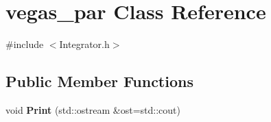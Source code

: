 \hypertarget{classvegas__par}{}\section{vegas\+\_\+par Class Reference}
\label{classvegas__par}


{\ttfamily \#include $<$Integrator.\+h$>$}

\subsection*{Public Member Functions}
\begin{DoxyCompactItemize}
\item 
\hypertarget{classvegas__par_a730b059d3c70a835152ca7b012e6c267}{}void {\bfseries Print} (std\+::ostream \&ost=std\+::cout)\label{classvegas__par_a730b059d3c70a835152ca7b012e6c267}

\end{DoxyCompactItemize}
